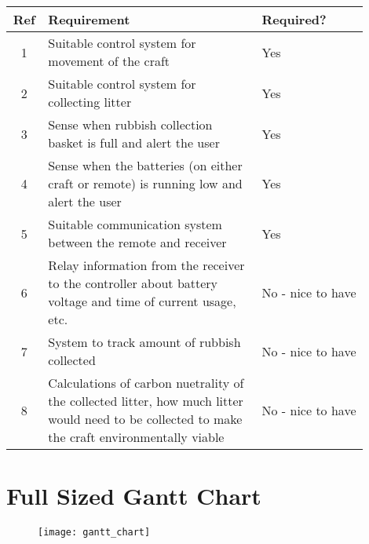 \documentclass [12pt]{article}
\begin{document}
\begin{table}[H]
\begin{tabular}{||c||p{0.6\linewidth}|p{0.3\linewidth}||}
\hline
Ref & Requirement                                                                                                                                  & Required?         \\ 
\hline
1   & Suitable control system for movement of the craft                                                                                              & Yes               \\
\hline
2   & Suitable control system for collecting litter                                                                                                  & Yes               \\
\hline
3   & Sense when rubbish collection basket is full and alert the user                                                                                & Yes               \\
\hline
4   & Sense when the batteries (on either craft or remote) is running low and alert the user                                                         & Yes               \\
\hline
5   & Suitable communication system between the remote and receiver                                                                                  & Yes               \\
\hline
6   & Relay information from the receiver to the controller about battery voltage and time of current usage, etc.                                    & No - nice to have \\
\hline
7   & System to track amount of rubbish collected                                                                                                    & No - nice to have \\
\hline
8   & Calculations of carbon nuetrality of the collected litter, how much litter would need to be collected to make the craft environmentally viable & No - nice to have \\
\hline
\end{tabular}
\end{table}

\section{Full Sized Gantt Chart}\label{app:gantt_chart}
\begin{figure}[H]
\centerline{\texttt{[image: gantt\_chart]}}
\end{figure}
\end{document}
